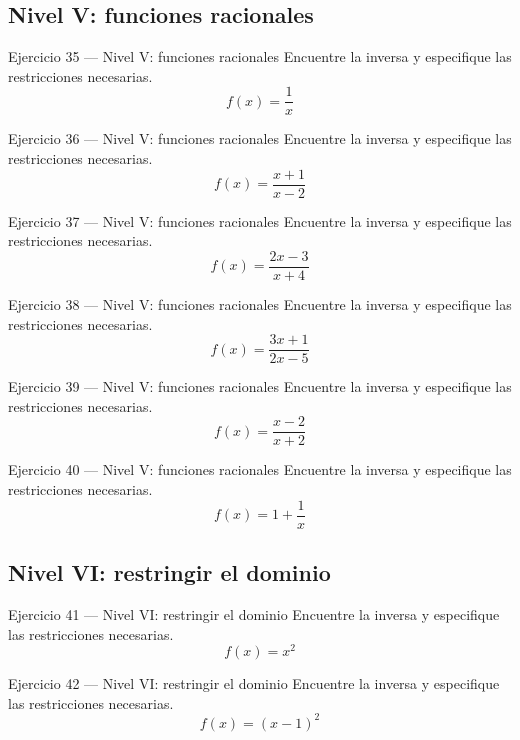 \documentclass[aspectratio=169,10pt]{beamer}
\begin{document}
\subsection{Nivel V: funciones racionales}
\begin{frame}{Ejercicio 35 — Nivel V: funciones racionales}
Encuentre la inversa y especifique las restricciones necesarias.
\[
f(x)=\frac1x
\]
\end{frame}

\begin{frame}{Ejercicio 36 — Nivel V: funciones racionales}
Encuentre la inversa y especifique las restricciones necesarias.
\[
f(x)=\frac{x+1}{x-2}
\]
\end{frame}

\begin{frame}{Ejercicio 37 — Nivel V: funciones racionales}
Encuentre la inversa y especifique las restricciones necesarias.
\[
f(x)=\frac{2x-3}{x+4}
\]
\end{frame}

\begin{frame}{Ejercicio 38 — Nivel V: funciones racionales}
Encuentre la inversa y especifique las restricciones necesarias.
\[
f(x)=\frac{3x+1}{2x-5}
\]
\end{frame}

\begin{frame}{Ejercicio 39 — Nivel V: funciones racionales}
Encuentre la inversa y especifique las restricciones necesarias.
\[
f(x)=\frac{x-2}{x+2}
\]
\end{frame}

\begin{frame}{Ejercicio 40 — Nivel V: funciones racionales}
Encuentre la inversa y especifique las restricciones necesarias.
\[
f(x)=1+\frac1x
\]
\end{frame}

\subsection{Nivel VI: restringir el dominio}
\begin{frame}{Ejercicio 41 — Nivel VI: restringir el dominio}
Encuentre la inversa y especifique las restricciones necesarias.
\[
f(x)=x^2
\]
\end{frame}

\begin{frame}{Ejercicio 42 — Nivel VI: restringir el dominio}
Encuentre la inversa y especifique las restricciones necesarias.
\[
f(x)=(x-1)^2
\]
\end{frame}
\end{document}
